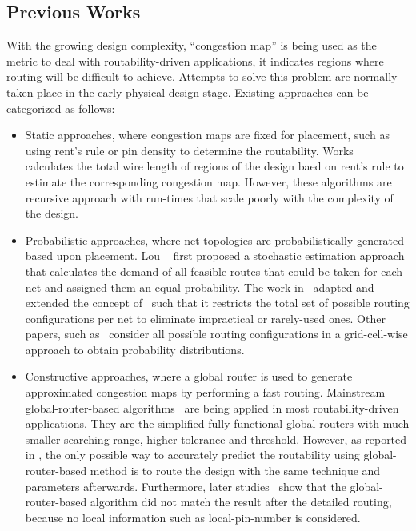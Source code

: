 \subsection{Previous Works}
With the growing design complexity, ``congestion map'' is being used as the metric to deal with routability-driven applications, it indicates regions where routing will be difficult to achieve. Attempts to solve this problem are normally taken place in the early physical design stage. Existing approaches can be categorized as follows:
\begin{itemize}
\item Static approaches, where congestion maps are fixed for placement, such as using rent's rule or pin density to determine the routability. Works~\cite{rentsrule,rentsrulerecursive} calculates the total wire length of regions of the design baed on rent's rule to estimate the corresponding congestion map. However, these algorithms are recursive approach with run-times that scale poorly with the complexity of the design. 
\item Probabilistic approaches, where net topologies are probabilistically generated based upon placement.  Lou \etal~\cite{first} first proposed a stochastic estimation approach that calculates the demand of all feasible routes that could be taken for each net and assigned them an equal probability. The work in~\cite{modeling} adapted and extended the concept of~\cite{first} such that it restricts the total set of possible routing configurations per net to eliminate impractical or rarely-used ones. Other papers, such as~\cite{SMD, 3step} consider all possible routing configurations in a grid-cell-wise approach to obtain probability distributions.
\item Constructive approaches, where a global router is used to generate approximated congestion maps by performing a fast routing.  Mainstream global-router-based algorithms~\cite{mixedsizeplacement,ripple,simplr,nctufast,fastroute} are being applied in most routability-driven applications. They are the simplified fully functional global routers with much smaller searching range, higher tolerance and threshold. However, as reported in \cite{fastroute}, the only possible way to accurately predict the routability using global-router-based method is to route the design with the same technique and parameters afterwards. Furthermore, later studies~\cite{study,ispd14,ispd15} show that the global-router-based algorithm did not match the result after the detailed routing, because no local information such as local-pin-number is considered.

\end{itemize}
